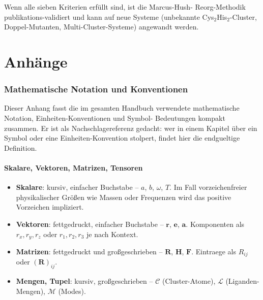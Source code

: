 \documentclass[11pt,a4paper,twoside]{article}
\theoremstyle{remark}
\begin{document}
Wenn alle sieben Kriterien erf\"ullt sind, ist die Marcus-Hush-
Reorg-Methodik publikations-validiert und kann auf neue Systeme
(unbekannte Cys$_2$His$_2$-Cluster, Doppel-Mutanten,
Multi-Cluster-Systeme) angewandt werden.

\appendix

\part{Anh\"ange}

\section{Mathematische Notation und Konventionen}
\label{app:notation}

Dieser Anhang fasst die im gesamten Handbuch verwendete
mathematische Notation, Einheiten-Konventionen und Symbol-
Bedeutungen kompakt zusammen. Er ist als Nachschlagereferenz
gedacht: wer in einem Kapitel \"uber ein Symbol oder eine
Einheiten-Konvention stolpert, findet hier die endgueltige
Definition.

\subsection{Skalare, Vektoren, Matrizen, Tensoren}

\begin{itemize}\setlength{\itemsep}{2pt}
  \item \textbf{Skalare}: kursiv, einfacher Buchstabe -- $a$, $b$,
        $\omega$, $T$. Im Fall vorzeichenfreier physikalischer
        Gr\"o{\ss}en wie Massen oder Frequenzen wird das positive
        Vorzeichen impliziert.
  \item \textbf{Vektoren}: fettgedruckt, einfacher Buchstabe --
        $\mathbf{r}$, $\mathbf{e}$, $\mathbf{a}$. Komponenten als
        $r_x, r_y, r_z$ oder $r_1, r_2, r_3$ je nach Kontext.
  \item \textbf{Matrizen}: fettgedruckt und gro{\ss}geschrieben --
        $\mathbf{R}$, $\mathbf{H}$, $\mathbf{F}$. Eintraege als
        $R_{ij}$ oder $(\mathbf{R})_{ij}$.
  \item \textbf{Mengen, Tupel}: kursiv, gro{\ss}geschrieben --
        $\mathcal{C}$ (Cluster-Atome), $\mathcal{L}$
        (Liganden-Mengen), $\mathcal{M}$ (Modes).
\end{itemize}
\end{document}
